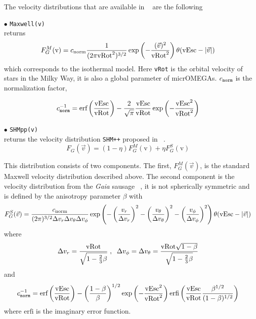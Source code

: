\documentclass[12pt,a4paper]{article}
\begin{document}
The velocity distributions that are available  in \micro~ are the following

\noindent
$\bullet$ \verb|Maxwell(v)| \\
returns   
\begin{equation}
F_G^M(\mbox{v})=  c_{\rm{norm}} \frac{1}{(2\pi \rm{vRot}^2)^{3/2}} \exp\left(
-\frac{(\vec{v})^2}{\rm{vRot}^2}\right)\theta(\mbox{vEsc} -|\vec{v}|)
\end{equation}
which corresponds to the isothermal model. Here  {\tt vRot} is the orbital velocity of stars in the Milky Way, it is also a  global 
parameter of micrOMEGAs. $c_{\tt norm}$ is the normalization factor,

\begin{equation}
c_{\tt norm}^{-1}=  {\mbox{erf}}\left(\frac{\mbox{vEsc}}{\rm{vRot}} \right) -\frac{2}{\sqrt{\pi}} \frac{\mbox{vEsc}}{\rm{vRot}} \exp\left( -\frac{\mbox{vEsc}^2}{\rm{vRot}^2}\right)
\end{equation} 

\noindent
$\bullet$ \verb|SHMpp(v)|\\
returns the  velocity distribution {\tt SHM++}  proposed in ~\cite{Evans:2018bqy}.
\begin{equation}
F_G(\vec{v}) = (1-\eta) F_G^M(\mbox{v}) +\eta F_G^S(\mbox{v})
\end{equation}

This distribution consists of two components. The first, $F_G^M(\vec{v})$,   
is  the standard Maxwell velocity distribution described above.   The second component  is the velocity distribution from the {\it Gaia} sausage ~\cite{Belokurov_2018,Myeong:2018kfh}, it  is not spherically symmetric and is defined by the
anisotropy parameter $\beta$ with
\begin{equation}
 F_G^S(\vec{v})=   \frac{c_{\rm{norm}} }{(2\pi)^{3/2} \Delta v_r \Delta v_\theta\Delta v_\phi}
  \exp\left( -\left( \frac{v_r}{\Delta v_r}\right)^2 
 -\left( \frac{v_\theta}{\Delta v_\theta}\right)^2  -\left( \frac{v_\phi}{\Delta v_\phi}\right)^2   \right)
\theta(\mbox{vEsc} -|\vec{v}|)
\end{equation}
where  
\begin{equation}
\Delta v_r= \frac{\rm{vRot}}{\sqrt{1-\frac{2}{3}\beta}}\;,\;\; \Delta v_\phi=\Delta v_\theta=\frac{\rm{vRot} \sqrt{1-\beta}}{\sqrt{1-\frac{2}{3}\beta}} 
\end{equation}  
and 
\begin{equation}
c_{\tt norm}^{-1}= {\mbox{erf}}\left(\frac{\mbox{vEsc}}{\rm{vRot}} \right) - \left( \frac{1-\beta}{\beta} \right)^{1/2}   \exp\left( -\frac{\mbox{vEsc}^2}{\rm{vRot}^2}\right) 
{\mbox{erfi}}\left( \frac{\mbox{vEsc}}{\rm{vRot}}\frac{\beta^{1/2}}{(1-\beta)^{1/2}}        \right)
\end{equation}  
where ${\mbox{erfi}}$ is the imaginary error function.
  
\end{document}
